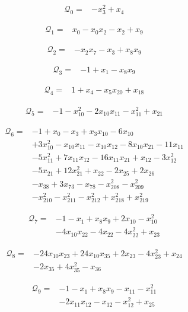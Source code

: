 \begin{align*}
\mathcal{Q}_{0}={}&-x_{3}^{2}+x_{4}
\end{align*}

\begin{align*}
\mathcal{Q}_{1}={}&x_{0}-x_{0}x_{2}-x_{2}+x_{9}
\end{align*}

\begin{align*}
\mathcal{Q}_{2}={}&-x_{2}x_{7}-x_{3}+x_{8}x_{9}
\end{align*}

\begin{align*}
\mathcal{Q}_{3}={}&-1+x_{1}-x_{8}x_{9}
\end{align*}

\begin{align*}
\mathcal{Q}_{4}={}&1+x_{4}-x_{5}x_{20}+x_{18}
\end{align*}

\begin{align*}
\mathcal{Q}_{5}={}&-1-x_{10}^{2}-2x_{10}x_{11}-x_{11}^{2}+x_{21}
\end{align*}

\begin{align*}
\mathcal{Q}_{6}={}&-1+x_{0}-x_{3}+x_{3}x_{10}-6x_{10}\\
&+3x_{10}^{2}-x_{10}x_{11}-x_{10}x_{12}-8x_{10}x_{21}-11x_{11}\\
&-5x_{11}^{2}+7x_{11}x_{12}-16x_{11}x_{21}+x_{12}-3x_{12}^{2}\\
&-5x_{21}+12x_{21}^{2}+x_{22}-2x_{25}+2x_{26}\\
&-x_{38}+3x_{73}-x_{78}-x_{208}^{2}-x_{209}^{2}\\
&-x_{210}^{2}-x_{211}^{2}-x_{212}^{2}+x_{218}^{2}+x_{219}^{2}
\end{align*}

\begin{align*}
\mathcal{Q}_{7}={}&-1-x_{1}+x_{8}x_{9}+2x_{10}-x_{10}^{2}\\
&-4x_{10}x_{22}-4x_{22}-4x_{22}^{2}+x_{23}
\end{align*}

\begin{align*}
\mathcal{Q}_{8}={}&-24x_{10}x_{23}+24x_{10}x_{35}+2x_{23}-4x_{23}^{2}+x_{24}\\
&-2x_{35}+4x_{35}^{2}-x_{36}
\end{align*}

\begin{align*}
\mathcal{Q}_{9}={}&-1-x_{1}+x_{8}x_{9}-x_{11}-x_{11}^{2}\\
&-2x_{11}x_{12}-x_{12}-x_{12}^{2}+x_{25}
\end{align*}

